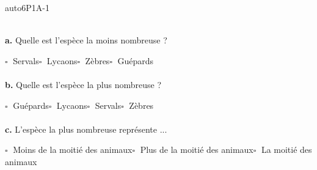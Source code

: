 \documentclass[a4paper,11pt,fleqn]{article}
\begin{document}
\begin{EXO}{}{auto6P1A-1}
\begin{tikzpicture}[baseline,scale = 0.5]
\end{tikzpicture}\\
\textbf {a.}  Quelle est l'espèce la moins nombreuse ? 
    
    	$\square\;$ Servals\qquad $\square\;$ Lycaons\qquad $\square\;$ Zèbres\qquad $\square\;$ Guépards\qquad \\
\\\textbf {b.}  Quelle est l'espèce la plus nombreuse ? 
    
    	$\square\;$ Guépards\qquad $\square\;$ Lycaons\qquad $\square\;$ Servals\qquad $\square\;$ Zèbres\qquad \\
\\\textbf {c.}  L'espèce la plus nombreuse représente ... 
    
    	$\square\;$ Moins de la moitié des animaux\qquad $\square\;$ Plus de la moitié des animaux\qquad $\square\;$ La moitié des animaux\qquad \\

\end{EXO}
\end{document}
